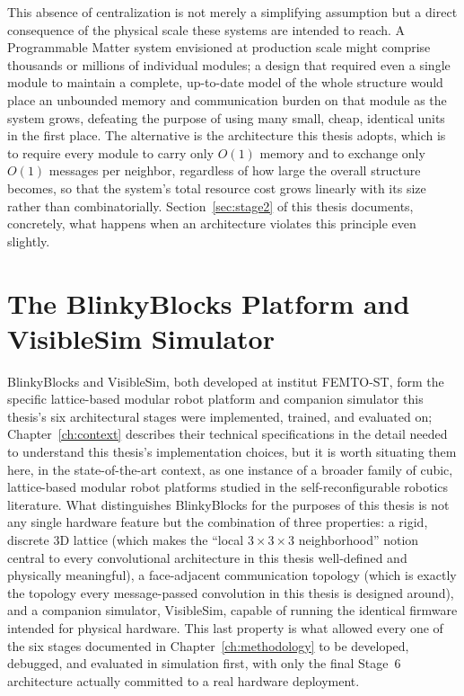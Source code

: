 \documentclass[12pt,a4paper]{report}
\begin{document}
This absence of centralization is not merely a simplifying assumption but a direct consequence of the physical scale these systems are intended to reach. A Programmable Matter system envisioned at production scale might comprise thousands or millions of individual modules; a design that required even a single module to maintain a complete, up-to-date model of the whole structure would place an unbounded memory and communication burden on that module as the system grows, defeating the purpose of using many small, cheap, identical units in the first place. The alternative is the architecture this thesis adopts, which is to require every module to carry only $O(1)$ memory and to exchange only $O(1)$ messages per neighbor, regardless of how large the overall structure becomes, so that the system's total resource cost grows linearly with its size rather than combinatorially. Section~\ref{sec:stage2} of this thesis documents, concretely, what happens when an architecture violates this principle even slightly.

\section{The BlinkyBlocks Platform and VisibleSim Simulator}

BlinkyBlocks and VisibleSim, both developed at institut FEMTO-ST, form the specific lattice-based modular robot platform and companion simulator this thesis's six architectural stages were implemented, trained, and evaluated on; Chapter~\ref{ch:context} describes their technical specifications in the detail needed to understand this thesis's implementation choices, but it is worth situating them here, in the state-of-the-art context, as one instance of a broader family of cubic, lattice-based modular robot platforms studied in the self-reconfigurable robotics literature. What distinguishes BlinkyBlocks for the purposes of this thesis is not any single hardware feature but the combination of three properties: a rigid, discrete 3D lattice (which makes the ``local $3\times3\times3$ neighborhood'' notion central to every convolutional architecture in this thesis well-defined and physically meaningful), a face-adjacent communication topology (which is exactly the topology every message-passed convolution in this thesis is designed around), and a companion simulator, VisibleSim, capable of running the identical firmware intended for physical hardware. This last property is what allowed every one of the six stages documented in Chapter~\ref{ch:methodology} to be developed, debugged, and evaluated in simulation first, with only the final Stage~6 architecture actually committed to a real hardware deployment.
\end{document}
